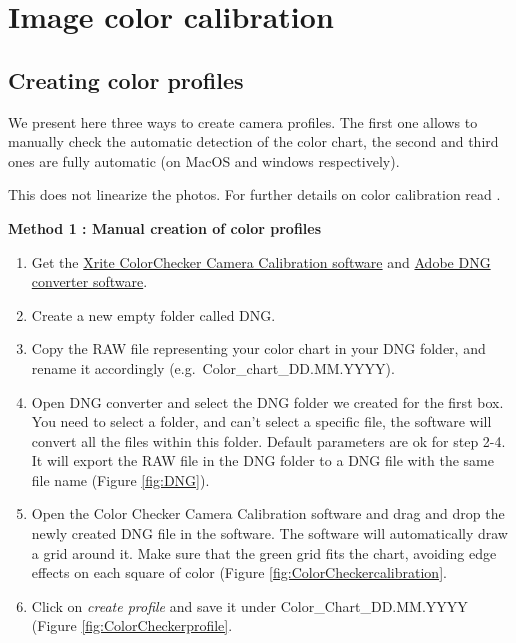 \documentclass[
]{book}
\begin{document}
\hypertarget{image-color-calibration}{%
\section{Image color calibration}\label{image-color-calibration}}

\hypertarget{creating-color-profiles}{%
\subsection{Creating color profiles}\label{creating-color-profiles}}

We present here three ways to create camera profiles. The first one
allows to manually check the automatic detection of the color chart, the
second and third ones are fully automatic (on MacOS and windows
respectively).

This does not linearize the photos. For further details on color
calibration read \citep{troscianko2015image}.

\textbf{Method 1 : Manual creation of color profiles}

\begin{enumerate}
\def\labelenumi{\arabic{enumi}.}
\item
  Get the \href{https://xritephoto.com/ph_product_overview.aspx?ID=938\&Action=Support\&SoftwareID=2030}{Xrite ColorChecker Camera Calibration
  software}
  and \href{https://helpx.adobe.com/photoshop/using/adobe-dng-converter.html}{Adobe DNG converter
  software}.
\item
  Create a new empty folder called DNG.
\item
  Copy the RAW file representing your color chart in your DNG folder,
  and rename it accordingly (e.g.~Color\_chart\_DD.MM.YYYY).
\item
  Open DNG converter and select the DNG folder we created for the
  first box. You need to select a folder, and can't select a specific
  file, the software will convert all the files within this folder.
  Default parameters are ok for step 2-4. It will export the RAW file
  in the DNG folder to a DNG file with the same file name (Figure \ref{fig:DNG}).
\item
  Open the Color Checker Camera Calibration software and drag and drop
  the newly created DNG file in the software. The software will
  automatically draw a grid around it. Make sure that the green grid
  fits the chart, avoiding edge effects on each square of color
  (Figure \ref{fig:ColorCheckercalibration}.
\item
  Click on \emph{create profile} and save it under Color\_Chart\_DD.MM.YYYY
  (Figure \ref{fig:ColorCheckerprofile}.
\end{enumerate}
\end{document}
